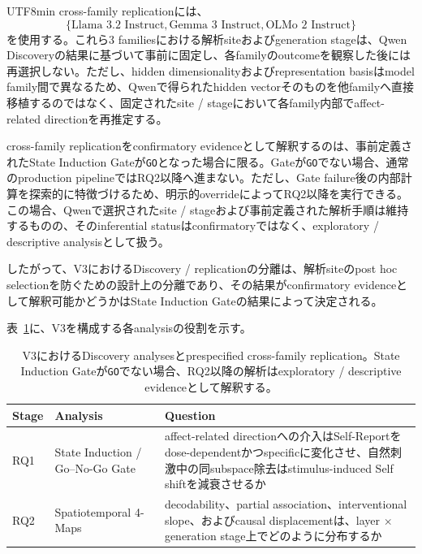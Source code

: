 \documentclass{article} %
\begin{document}
\begin{CJK*}{UTF8}{min}
cross-family replicationには、
\[
\{
\text{Llama 3.2 Instruct},
\text{Gemma 3 Instruct},
\text{OLMo 2 Instruct}
\}
\]
を使用する。これら3 familiesにおける解析siteおよびgeneration stageは、Qwen Discoveryの結果に基づいて事前に固定し、各familyのoutcomeを観察した後には再選択しない。ただし、hidden dimensionalityおよびrepresentation basisはmodel family間で異なるため、Qwenで得られたhidden vectorそのものを他familyへ直接移植するのではなく、固定されたsite / stageにおいて各family内部でaffect-related directionを再推定する。

cross-family replicationをconfirmatory evidenceとして解釈するのは、事前定義されたState Induction Gateが\texttt{GO}となった場合に限る。Gateが\texttt{GO}でない場合、通常のproduction pipelineではRQ2以降へ進まない。ただし、Gate failure後の内部計算を探索的に特徴づけるため、明示的overrideによってRQ2以降を実行できる。この場合、Qwenで選択されたsite / stageおよび事前定義された解析手順は維持するものの、そのinferential statusはconfirmatoryではなく、exploratory / descriptive analysisとして扱う。

したがって、V3におけるDiscovery / replicationの分離は、解析siteのpost hoc selectionを防ぐための設計上の分離であり、その結果がconfirmatory evidenceとして解釈可能かどうかはState Induction Gateの結果によって決定される。

表~\ref{tab:v3-overview}に、V3を構成する各analysisの役割を示す。

\begin{table}[htbp]
\centering
\small
\caption{V3におけるDiscovery analysesとprespecified cross-family replication。State Induction Gateが\texttt{GO}でない場合、RQ2以降の解析はexploratory / descriptive evidenceとして解釈する。}
\label{tab:v3-overview}
\begin{tabularx}{\linewidth}{
@{}
>{\raggedright\arraybackslash}p{1.5cm}
>{\raggedright\arraybackslash}p{3.1cm}
>{\raggedright\arraybackslash}X
@{}
}
\toprule
\textbf{Stage} &
\textbf{Analysis} &
\textbf{Question} \\
\midrule

RQ1 &
State Induction / Go--No-Go Gate &
affect-related directionへの介入はSelf-Reportをdose-dependentかつspecificに変化させ、自然刺激中の同subspace除去はstimulus-induced Self shiftを減衰させるか \\

RQ2 &
Spatiotemporal 4-Maps &
decodability、partial association、interventional slope、およびcausal displacementは、layer $\times$ generation stage上でどのように分布するか \\


\end{tabularx}
\end{table}
\end{CJK*}
\end{document}
